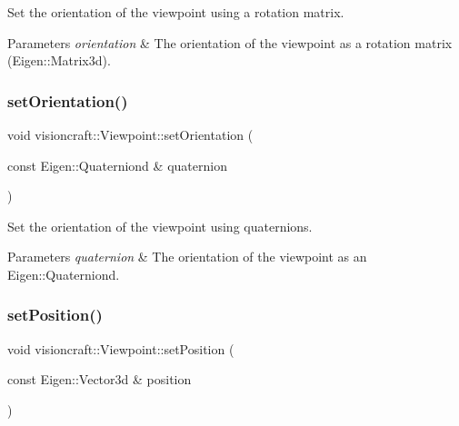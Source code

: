Set the orientation of the viewpoint using a rotation matrix. 


\begin{DoxyParams}{Parameters}
{\em orientation} & The orientation of the viewpoint as a rotation matrix (Eigen\+::\+Matrix3d). \\
\hline
\end{DoxyParams}
\mbox{\label{classvisioncraft_1_1Viewpoint_a681ff114c9fcf0d84f848a70db673e74}} 
\subsubsection{\texorpdfstring{set\+Orientation()}{setOrientation()}\hspace{0.1cm}{\footnotesize\ttfamily [2/2]}}
{\footnotesize\ttfamily void visioncraft\+::\+Viewpoint\+::set\+Orientation (\begin{DoxyParamCaption}\item[{const Eigen\+::\+Quaterniond \&}]{quaternion }\end{DoxyParamCaption})}



Set the orientation of the viewpoint using quaternions. 


\begin{DoxyParams}{Parameters}
{\em quaternion} & The orientation of the viewpoint as an Eigen\+::\+Quaterniond. \\
\hline
\end{DoxyParams}
\mbox{\label{classvisioncraft_1_1Viewpoint_acfd98e5627f6c9ca6f55aae9a473621e}} 
\subsubsection{\texorpdfstring{set\+Position()}{setPosition()}}
{\footnotesize\ttfamily void visioncraft\+::\+Viewpoint\+::set\+Position (\begin{DoxyParamCaption}\item[{const Eigen\+::\+Vector3d \&}]{position }\end{DoxyParamCaption})}



